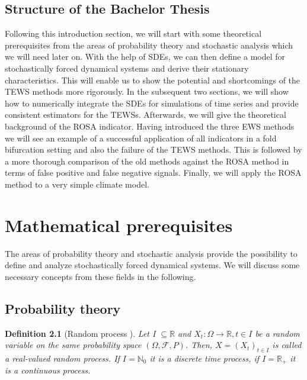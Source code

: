 \documentclass[%
thesis=student,%
coverpage=false,%
titlepage=false,%
headmarks=true, %
english,%
font=libertine, %
math=newpxtx, %
BCOR=5mm,%
coverBCOR=11mm%
]{tumbook}
\newtheorem{definition}{Definition}[section]
\begin{document}
\section{Structure of the Bachelor Thesis}
Following this introduction section, we will start with some theoretical prerequisites from the areas of probability theory and stochastic analysis which we will need later on. With the help of SDEs, we can then define a model for stochastically forced dynamical systems and derive their stationary characteristics. This will enable us to show the potential and shortcomings of the TEWS methods more rigorously. In the subsequent two sections, we will show how to numerically integrate the SDEs for simulations of time series and provide consistent estimators for the TEWSs. Afterwards, we will give the theoretical background of the ROSA indicator. Having introduced the three EWS methods we will see an example of a successful application of all indicators in a fold bifurcation setting and also the failure of the TEWS methods. This is followed by a more thorough comparison of the old methods against the ROSA method in terms of false positive and false negative signals. Finally, we will apply the ROSA method to a very simple climate model.





\chapter{Mathematical prerequisites}

The areas of probability theory and stochastic analysis provide the possibility to define and analyze stochastically forced dynamical systems. We will discuss some necessary concepts from these fields in the following.

\section{Probability theory}

\begin{definition}[Random process \cite{rolles:2023}]
Let I $\subseteq \mathbb{R}$ and $X_{t}:\Omega \rightarrow \mathbb{R}, t \in I$ be a random variable on the same probability space $(\Omega,\mathcal{F},P)$. Then, $X = (X_{t})_{t \in I} $ is called a real-valued random process. If $I = \mathbb{N}_{0}$ it is a discrete time process, if  $I = \mathbb{R}_{+}$ it is a continuous process.
\end{definition}
\end{document}
